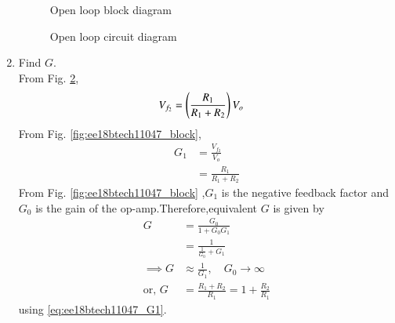 \begin{enumerate}[label=\arabic*.,ref=\theenumi]
\renewcommand{\thefigure}{\theenumi.\arabic{figure}}
%
\begin{figure}[!ht]
	\begin{center}
		\resizebox{\columnwidth}{!}{}
	\end{center}
\caption{Open loop block diagram}
\label{fig:ee18btech11047_fig6}
\end{figure}
%
\begin{figure}[!ht]
	\begin{center}
		\resizebox{\columnwidth}{!}{}
	\end{center}
\caption{Open loop circuit diagram}
\label{fig:ee18btech11047_fig7}
\end{figure}
\renewcommand{\thefigure}{\theenumi}
%
\item Find $G$.
\\
\solution From Fig. \ref{fig:ee18btech11047_fig7},
\begin{align}
V_{f_{2}} &= \left(\frac{R_{1}}{R_{1} + R_{2}}\right)V_{o}
\end{align}
From Fig. \ref{fig:ee18btech11047_block},
%
\begin{align}
G_{1} &= \frac{V_{f_{2}}}{V_{o}}
\\
&= \frac{R_{1}}{R_{1} + R_{2}}
\label{eq:ee18btech11047_G1}
\end{align}
From Fig. \ref{fig:ee18btech11047_block} ,$G_{1}$ is the negative feedback factor and $G_{0}$ is the gain of the op-amp.Therefore,equivalent $G$ is given by
\begin{align}
G &= \frac{G_{0}}{1+G_{0}G_{1}}
\\
&= \frac{1}{\frac{1}{G_{0}} + G_{1}}
\\
\implies G&\approx \frac{1}{G_{1}}, \quad   G_{0}\to\infty
\\
\text{or, } G &= \frac{R_{1}+R_{2}}{R_{1}}=1+\frac{R_{2}}{R_{1}}
\label{eq:ee18btech11047_G}
\end{align}
 using  \eqref{eq:ee18btech11047_G1}.

\end{enumerate}
